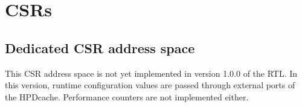 \documentclass[10pt,titlepage,twoside]{book}
\begin{document}




\clearpage
\chapter{\acfp{CSR}}
\minitoc
\newpage

\section{Dedicated CSR address space}

\begin{tcolorbox}[colback=red!10!white,
                  colframe=white!10!red,
                  title=\textbf{Important},
                  center, valign=top, halign=left,
                  center title,
                  width=.950\linewidth]
This CSR address space is not yet implemented in version 1.0.0 of the RTL.
In this version, runtime configuration values are passed through external ports of the HPDcache.
Performance counters are not implemented either.
\end{tcolorbox}
\end{document}
